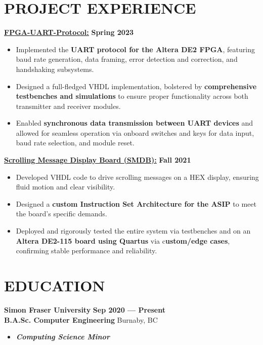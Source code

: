 \documentclass[letterpaper,11pt]{article}
\newcommand{\Item} [1] {
    \item\small{{#1 \vspace{-2pt}}}
}
\newcommand{\school} [6] {
    {\textbf{#1} \hfill \textbf{#5 --- #6}\\ \textbf{#3} \hfill #2\\ \begin{itemize}[topsep=0pt,itemsep=-2pt]\item{\textbf{\emph{#4}}}\end{itemize}}
}
\newcommand{\resumeItemListStart} [0] {
    \vspace{2pt}
    \begin{itemize}[topsep=0pt,itemsep=-2pt]
}
\newcommand{\resumeItemListEnd} [0] {
    \end{itemize}
    \vspace{5pt}
}
\begin{document}
    \section{PROJECT EXPERIENCE}
    \href{https://github.com/SatireSage/FPGA-UART-Protocol}{{\color{colorValue}} \underline{\textbf{FPGA-UART-Protocol:}}} \hfill \textbf{Spring 2023}
    \resumeItemListStart{}
        \Item{Implemented the \textbf{UART protocol for the Altera DE2 FPGA}, featuring baud rate generation, data framing, error detection and correction, and handshaking subsystems.}
        \Item{Designed a full-fledged VHDL implementation, bolstered by \textbf{comprehensive testbenches and simulations} to ensure proper functionality across both transmitter and receiver modules.}
        \Item{Enabled \textbf{synchronous data transmission between UART devices} and allowed for seamless operation via onboard switches and keys for data input, baud rate selection, and module reset.}
    \resumeItemListEnd{}
    \href{https://github.com/SatireSage/Scrolling-Message-Display-Board}{{\color{colorValue}} \underline{\textbf{Scrolling Message Display Board (SMDB):}}} \hfill \textbf{Fall 2021}
    \resumeItemListStart{}
        \Item{Developed VHDL code to drive scrolling messages on a HEX display, ensuring fluid motion and clear visibility.}
        \Item{Designed a \textbf{custom Instruction Set Architecture for the ASIP} to meet the board's specific demands.}
        \Item{Deployed and rigorously tested the entire system via testbenches and on an \textbf{Altera DE2-115 board using Quartus} via c\textbf{ustom/edge cases}, confirming stable performance and reliability.}
    \resumeItemListEnd{}

    \section{EDUCATION}
    \school{Simon Fraser University}{Burnaby, BC}{B.A.Sc. Computer Engineering}{Computing Science Minor}{Sep 2020}{Present}
\end{document}
